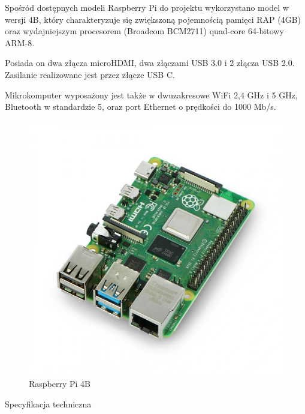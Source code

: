 \documentclass[a4paper,12pt,reqno]{article}
\begin{document}
Spośród dostępnych modeli Raspberry Pi do projektu wykorzystano model w wersji 4B, który charakteryzuje się zwiększoną pojemnością pamięci RAP (4GB) oraz wydajniejszym procesorem (Broadcom BCM2711) quad-core 64-bitowy ARM-8.

Posiada on dwa złącza microHDMI, dwa złączami USB 3.0 i 2 złącza USB 2.0. Zasilanie realizowane jest przez złącze USB C.

Mikrokomputer wyposażony jest także w dwuzakresowe WiFi 2,4 GHz i 5 GHz, Bluetooth w standardzie 5, oraz port Ethernet o prędkości do 1000 Mb/s.

\begin{figure}[H]%
\centering
\includegraphics[width=0.8\columnwidth]{imgs/raspberrypi4.jpg}
\caption{Raspberry Pi 4B \cite{img_rp4b} \label{rp4b}}
\quad
\end{figure}

Specyfikacja techniczna
\end{document}
